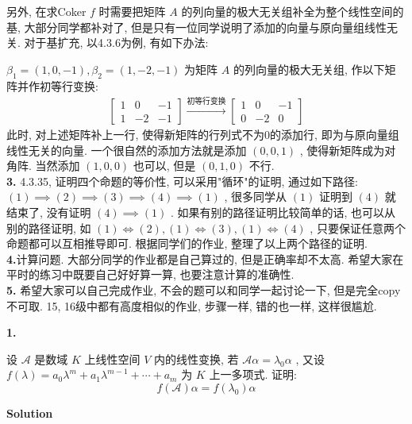 \documentclass[11pt,a4paper,openany,oneside]{book}
\newcommand\Solution{\noindent\textbf{\textsf{Solution}}\par\medskip}
\begin{document}
另外, 在求Coker $ f $ 时需要把矩阵 $ A $ 的列向量的极大无关组补全为整个线性空间的基, 大部分同学都补对了, 但是只有一位同学说明了添加的向量与原向量组线性无关. 对于基扩充, 以4.3.6为例, 有如下办法:

 $ \beta_1=(1, 0, -1), \beta_2=(1, -2, -1) $ 为矩阵 $ A $ 的列向量的极大无关组, 作以下矩阵并作初等行变换:
\begin{gather*}
\begin{bmatrix}
1  &  0  &  -1 \\
1&  -2 &  -1  
\end{bmatrix} \xrightarrow{初等行变换}
\begin{bmatrix}
1  &  0  &  -1  \\
0  &  -2  &  0
\end{bmatrix}
\end{gather*}
此时, 对上述矩阵补上一行, 使得新矩阵的行列式不为0的添加行, 即为与原向量组线性无关的向量. 一个很自然的添加方法就是添加 $ (0, 0, 1) $ , 使得新矩阵成为对角阵. 当然添加 $ (1,0,0) $ 也可以, 但是 $ (0,1,0) $ 不行. \\

\textbf{3.} 4.3.35, 证明四个命题的等价性, 可以采用"循环"的证明, 通过如下路径: $ (1) \implies (2) \implies (3) \implies (4) \implies (1) $ , 很多同学从 $ (1) $ 证明到 $ (4) $ 就结束了, 没有证明 $ (4) \implies (1) $ . 如果有别的路径证明比较简单的话, 也可以从别的路径证明, 如 $ (1) \Leftrightarrow (2),(1) \Leftrightarrow (3), (1) \Leftrightarrow (4) $ , 只要保证任意两个命题都可以互相推导即可. 根据同学们的作业, 整理了以上两个路径的证明.  \\ 

\textbf{4.}计算问题. 大部分同学的作业都是自己算过的, 但是正确率却不太高. 希望大家在平时的练习中既要自己好好算一算, 也要注意计算的准确性. \\

\textbf{5.} 希望大家可以自己完成作业, 不会的题可以和同学一起讨论一下, 但是完全copy不可取. 15, 16级中都有高度相似的作业, 步骤一样, 错的也一样, 这样很尴尬. \\


\begin{myexample}
	\textbf{1.} 

设 $ \mathcal{A} $ 是数域 $ K $ 上线性空间 $ V $ 内的线性变换, 若 $ \mathcal{A}\alpha = \lambda_0\alpha $ , 又设 $ f(\lambda) = a_0\lambda^m + a_1\lambda^{m-1} + \cdots + a_m $ 为 $ K $ 上一多项式. 证明:
 $$  f(\mathcal{A})\alpha = f(\lambda_0)\alpha  $$ 

\end{myexample}
\Solution 
\end{document}
